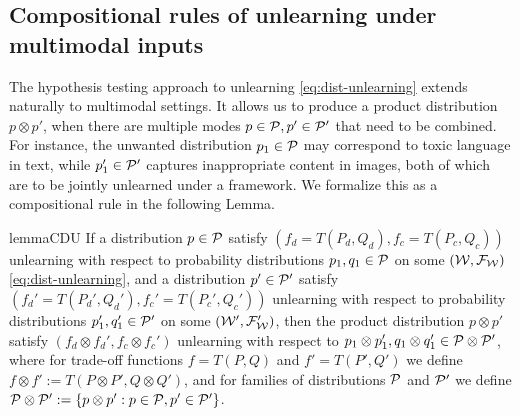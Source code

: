 \subsection{Compositional rules of unlearning under multimodal inputs}
\vspace{-2 mm}
The hypothesis testing approach to unlearning \eqref{eq:dist-unlearning} extends naturally to multimodal settings. It allows us to produce a product distribution $p\otimes p'$, when there are multiple modes $p\in \mathcal{P}, p'\in \mathcal{P}'$ that need to be combined. For instance, the unwanted distribution $p_1 \in \mathcal{P}$ may correspond to toxic language in text, while $p_1' \in \mathcal{P}'$  captures inappropriate content in images, both of which are to be jointly unlearned under a framework. We formalize this as a compositional rule in the following Lemma.
\vspace{-1 mm}
\begin{restatable}{lemma}{CDU}
\label{lem:CDU}
If a distribution $p \in \mathcal{P}$ satisfy $(f_d=T(P_d,Q_d),f_c=T(P_c,Q_c))$ unlearning with respect to  probability distributions $p_1,q_1\in \mathcal{P}$ on some $(\mathcal{W}, \mathcal{F}_{\mathcal{W}})$ \eqref{eq:dist-unlearning}, and a distribution $p' \in \mathcal{P}'$ satisfy $(f_d'=T(P_d',Q_d'),f_c'=T(P_c',Q_c'))$ unlearning with respect to  probability distributions $p_1',q_1'\in \mathcal{P}'$ on some $(\mathcal{W}', \mathcal{F}_{\mathcal{W}}')$, then the product distribution $p\otimes p'$ satisfy $(f_d\otimes f_d', f_c\otimes f_c')$  unlearning with respect to $p_1\otimes p_1', q_1\otimes q_1' \in \mathcal{P} \otimes \mathcal{P}'$, where  for trade-off functions $f=T(P,Q)$ and $f'=T(P',Q')$ we define $f\otimes f':= T(P\otimes P', Q\otimes Q')$, and for families of distributions $\mathcal{P}$ and $\mathcal{P}'$ we define $\mathcal{P}\otimes \mathcal{P}':=\{p\otimes p': p\in \mathcal{P}, p'\in \mathcal{P}'\}$.
\end{restatable}
\vspace{-2 mm}
